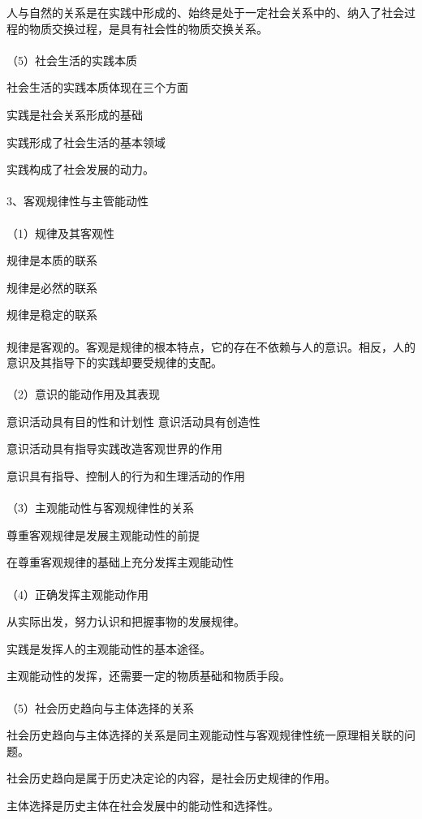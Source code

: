 \documentclass{ctexart}
\begin{document}
人与自然的关系是在实践中形成的、始终是处于一定社会关系中的、纳入了社会过程的物质交换过程，是具有社会性的物质交换关系。
\\\\
（5）社会生活的实践本质

社会生活的实践本质体现在三个方面

实践是社会关系形成的基础

实践形成了社会生活的基本领域

实践构成了社会发展的动力。
\\\\

3、客观规律性与主管能动性\\\\
（1）规律及其客观性

规律是本质的联系

规律是必然的联系

规律是稳定的联系
\\\\
规律是客观的。客观是规律的根本特点，它的存在不依赖与人的意识。相反，人的意识及其指导下的实践却要受规律的支配。
\\\\
（2）意识的能动作用及其表现

意识活动具有目的性和计划性
意识活动具有创造性

意识活动具有指导实践改造客观世界的作用

意识具有指导、控制人的行为和生理活动的作用
\\\\
（3）主观能动性与客观规律性的关系

尊重客观规律是发展主观能动性的前提

在尊重客观规律的基础上充分发挥主观能动性
\\\\
（4）正确发挥主观能动作用

从实际出发，努力认识和把握事物的发展规律。

实践是发挥人的主观能动性的基本途径。

主观能动性的发挥，还需要一定的物质基础和物质手段。
\\\\
（5）社会历史趋向与主体选择的关系

社会历史趋向与主体选择的关系是同主观能动性与客观规律性统一原理相关联的问题。

社会历史趋向是属于历史决定论的内容，是社会历史规律的作用。

主体选择是历史主体在社会发展中的能动性和选择性。
\end{document}
